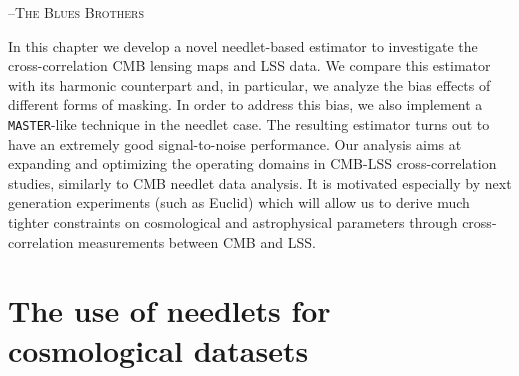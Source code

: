 \setlength{\epigraphwidth}{.7\textwidth}
\begin{epigraphs}
%
 {--\textsc{The Blues Brothers}}
 \end{epigraphs}

In this chapter we develop a novel needlet-based estimator to investigate the cross-correlation 
\gls{CMB} lensing maps and \gls{LSS} data. We 
compare this estimator with its harmonic counterpart and, in particular, we analyze the bias effects of 
different forms of masking. In order to address this bias, we also implement a \texttt{MASTER}-like technique in 
the needlet case. The resulting estimator turns out to have an extremely good signal-to-noise 
performance. Our analysis aims at expanding and optimizing the operating domains in CMB-LSS 
cross-correlation studies, similarly to CMB needlet data analysis. It is motivated especially by next 
generation experiments (such as Euclid) which 
will allow us to derive much tighter constraints on cosmological and astrophysical parameters through
cross-correlation measurements between CMB and LSS.


\section{The use of needlets for cosmological datasets}
\label{sec:intro}


